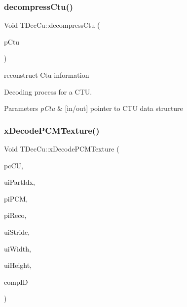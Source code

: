 \subsubsection{\texorpdfstring{decompress\+Ctu()}{decompressCtu()}}
{\footnotesize\ttfamily Void T\+Dec\+Cu\+::decompress\+Ctu (\begin{DoxyParamCaption}\item[{\hyperlink{class_t_com_data_c_u}{T\+Com\+Data\+CU} $\ast$}]{p\+Ctu }\end{DoxyParamCaption})}



reconstruct Ctu information 

Decoding process for a C\+TU. 
\begin{DoxyParams}{Parameters}
{\em p\+Ctu} & \mbox{[}in/out\mbox{]} pointer to C\+TU data structure \\
\hline
\end{DoxyParams}
\mbox{\label{class_t_dec_cu_a96fde1daad45b7fd22f37e6fe04709a8}} 
\subsubsection{\texorpdfstring{x\+Decode\+P\+C\+M\+Texture()}{xDecodePCMTexture()}}
{\footnotesize\ttfamily Void T\+Dec\+Cu\+::x\+Decode\+P\+C\+M\+Texture (\begin{DoxyParamCaption}\item[{\hyperlink{class_t_com_data_c_u}{T\+Com\+Data\+CU} $\ast$}]{pc\+CU,  }\item[{const U\+Int}]{ui\+Part\+Idx,  }\item[{const \hyperlink{_type_def_8h_af92141699657699b4b547be0c8517541}{Pel} $\ast$}]{pi\+P\+CM,  }\item[{\hyperlink{_type_def_8h_af92141699657699b4b547be0c8517541}{Pel} $\ast$}]{pi\+Reco,  }\item[{const U\+Int}]{ui\+Stride,  }\item[{const U\+Int}]{ui\+Width,  }\item[{const U\+Int}]{ui\+Height,  }\item[{const Component\+ID}]{comp\+ID }\end{DoxyParamCaption})\hspace{0.3cm}{\ttfamily [protected]}}


